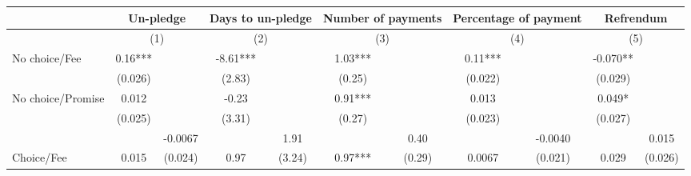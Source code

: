 \begin{tabular}{rrrrrrrrrrr}
\toprule
      & \multicolumn{2}{c}{Un-pledge} & \multicolumn{2}{c}{Days to un-pledge} & \multicolumn{2}{c}{Number of payments} & \multicolumn{2}{c}{Percentage of payment} & \multicolumn{2}{c}{Refrendum} \\
\midrule
\midrule
      & \multicolumn{2}{c}{(1)} & \multicolumn{2}{c}{(2)} & \multicolumn{2}{c}{(3)} & \multicolumn{2}{c}{(4)} & \multicolumn{2}{c}{(5)} \\
\midrule
\midrule
\multicolumn{1}{l}{No choice/Fee} & \multicolumn{1}{c}{0.16***} & \multicolumn{1}{c}{} & \multicolumn{1}{c}{-8.61***} & \multicolumn{1}{c}{} & \multicolumn{1}{c}{1.03***} & \multicolumn{1}{c}{} & \multicolumn{1}{c}{0.11***} & \multicolumn{1}{c}{} & \multicolumn{1}{c}{-0.070**} & \multicolumn{1}{c}{} \\
      & \multicolumn{1}{c}{(0.026)} & \multicolumn{1}{c}{} & \multicolumn{1}{c}{(2.83)} & \multicolumn{1}{c}{} & \multicolumn{1}{c}{(0.25)} & \multicolumn{1}{c}{} & \multicolumn{1}{c}{(0.022)} & \multicolumn{1}{c}{} & \multicolumn{1}{c}{(0.029)} & \multicolumn{1}{c}{} \\
\multicolumn{1}{l}{No choice/Promise} & \multicolumn{1}{c}{0.012} & \multicolumn{1}{c}{} & \multicolumn{1}{c}{-0.23} & \multicolumn{1}{c}{} & \multicolumn{1}{c}{0.91***} & \multicolumn{1}{c}{} & \multicolumn{1}{c}{0.013} & \multicolumn{1}{c}{} & \multicolumn{1}{c}{0.049*} & \multicolumn{1}{c}{} \\
\multicolumn{1}{l}{} & \multicolumn{1}{c}{(0.025)} & \multicolumn{1}{c}{} & \multicolumn{1}{c}{(3.31)} & \multicolumn{1}{c}{} & \multicolumn{1}{c}{(0.27)} & \multicolumn{1}{c}{} & \multicolumn{1}{c}{(0.023)} & \multicolumn{1}{c}{} & \multicolumn{1}{c}{(0.027)} & \multicolumn{1}{c}{} \\
      &       & \multicolumn{1}{c}{\cellcolor[rgb]{ .949,  .949,  .949} -0.0067} &       & \multicolumn{1}{c}{\cellcolor[rgb]{ .949,  .949,  .949} 1.91} &       & \multicolumn{1}{c}{\cellcolor[rgb]{ .949,  .949,  .949} 0.40} &       & \multicolumn{1}{c}{\cellcolor[rgb]{ .949,  .949,  .949} -0.0040} &       & \multicolumn{1}{c}{\cellcolor[rgb]{ .949,  .949,  .949} 0.015} \\
\multicolumn{1}{l}{Choice/Fee} & \multicolumn{1}{c}{0.015} & \multicolumn{1}{c}{\cellcolor[rgb]{ .949,  .949,  .949} (0.024)} & \multicolumn{1}{c}{0.97} & \multicolumn{1}{c}{\cellcolor[rgb]{ .949,  .949,  .949} (3.24)} & \multicolumn{1}{c}{0.97***} & \multicolumn{1}{c}{\cellcolor[rgb]{ .949,  .949,  .949} (0.29)} & \multicolumn{1}{c}{0.0067} & \multicolumn{1}{c}{\cellcolor[rgb]{ .949,  .949,  .949} (0.021)} & \multicolumn{1}{c}{0.029} & \multicolumn{1}{c}{\cellcolor[rgb]{ .949,  .949,  .949} (0.026)} \\

\end{tabular}
